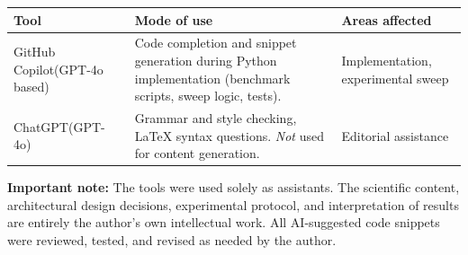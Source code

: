\documentclass[
]{elteikthesis}[2024/04/26]
\begin{document}
\begin{center}
\begin{tabular}{|p{3.5cm}|p{5.5cm}|p{4.5cm}|}
\hline
\textbf{Tool} & \textbf{Mode of use} & \textbf{Areas affected} \\
\hline
GitHub Copilot\newline(GPT-4o based) &
Code completion and snippet generation during Python implementation
(benchmark scripts, sweep logic, tests). &
Implementation, experimental sweep \\
\hline
ChatGPT\newline(GPT-4o) &
Grammar and style checking, \LaTeX{} syntax questions.
\emph{Not} used for content generation. &
Editorial assistance \\
\hline
\end{tabular}
\end{center}

\bigskip
\noindent
\textbf{Important note:} The tools were used solely as assistants.
The scientific content, architectural design decisions, experimental protocol,
and interpretation of results are entirely the author's own intellectual work.
All AI-suggested code snippets were reviewed, tested, and revised as needed
by the author.

{}
\printbibliography[title=\biblabel]
\cleardoublepage

{}
\listoffigures
\cleardoublepage
\end{document}
